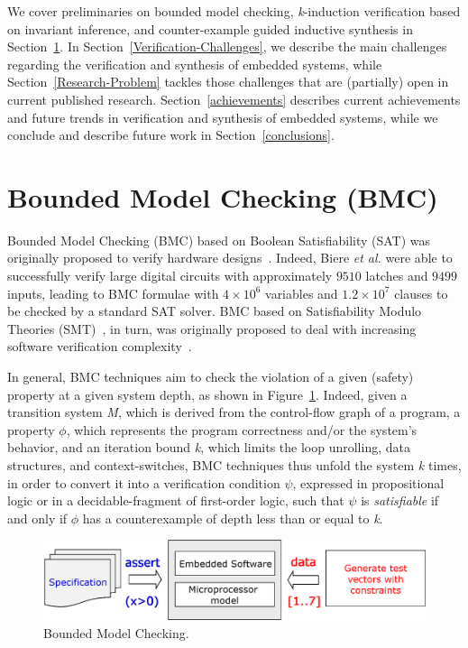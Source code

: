 \documentclass{acm_sen_article}
\begin{document}
We cover preliminaries on bounded model checking, \textit{k}-induction verification based on invariant inference, and counter-example guided inductive synthesis in Section~\ref{Preliminaries}. In Section~\ref{Verification-Challenges}, we describe the main challenges regarding the verification and synthesis of embedded systems, while Section~\ref{Research-Problem} tackles those challenges that are (partially) open in current published research. Section~\ref{achievements} describes current achievements and future trends in verification and synthesis of embedded systems, while we conclude and describe future work in Section~\ref{conclusions}.

\section{Bounded Model Checking (BMC)}
\label{Preliminaries}

Bounded Model Checking (BMC) based on Boolean Satisfiability (SAT) was originally proposed to verify hardware designs~\cite{Biere99,handbook09}. Indeed, Biere {\it et al.} were able to successfully verify large digital circuits with approximately $9510$ latches and $9499$ inputs, leading to BMC formulae with $4 \times 10^6$ variables and $1.2 \times 10^7$ clauses to be checked by a standard SAT solver. BMC based on Satisfiability Modulo Theories (SMT)~\cite{BarrettSST09}, in turn, was originally proposed to deal with increasing software verification complexity~\cite{Armando06}. 

In general, BMC techniques aim to check the violation of a given (safety) property at a given system depth, as shown in Figure~\ref{bounded-model-checking}. Indeed, given a transition system \textit{M}, which is derived from the control-flow graph of a program, a property $\phi$, which represents the program correctness and/or the system's behavior, and an iteration bound \textit{k}, which limits the loop unrolling, data structures, and context-switches, BMC techniques thus unfold the system \textit{k} times, in order to convert it into a verification condition $\psi$, expressed in propositional logic or in a decidable-fragment of first-order logic, such that $\psi$ is \textit{satisfiable} if and only if $\phi$ has a counterexample of depth less than or equal to \textit{k}.

\begin{figure}[h]
	\centering
	\includegraphics[scale=0.35]{figure2.eps}
	\caption{Bounded Model Checking.}
	\label{bounded-model-checking}
\end{figure}
\end{document}
